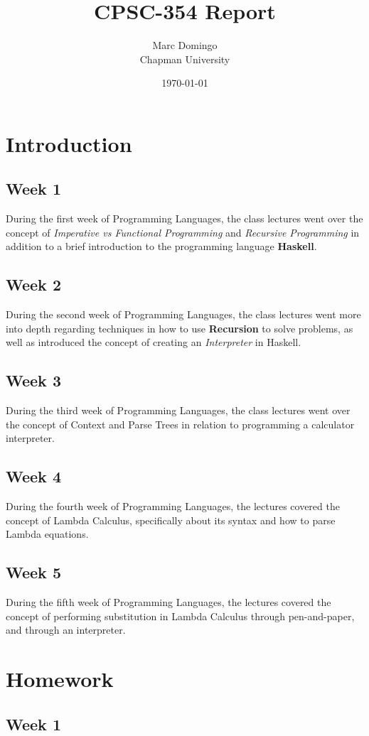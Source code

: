 \documentclass{article}
\title{CPSC-354 Report}
\author{Marc Domingo  \\ Chapman University}
\date{\today}
\theoremstyle{theorem}
\theoremstyle{definition}
\theoremstyle{remark}
\begin{document}
\maketitle
\section{Introduction}\label{introduction}
\subsection{Week 1}
\hspace{10mm} During the first week of Programming Languages, the class lectures went over the concept of \textit{Imperative vs Functional Programming} and \textit{Recursive Programming} in addition to a brief introduction to the programming language \textbf{Haskell}.
\subsection{Week 2}
\hspace{10mm} During the second week of Programming Languages, the class lectures went more into depth regarding techniques in how to use \textbf{Recursion} to solve problems, as well as introduced the concept of creating an \textit{Interpreter} in Haskell.
\subsection{Week 3} During the third week of Programming Languages, the class lectures went over the concept of Context and Parse Trees in relation to programming a calculator interpreter.
\subsection{Week 4} During the fourth week of Programming Languages, the lectures covered the concept of Lambda Calculus, specifically about its syntax and how to parse Lambda equations.
\subsection{Week 5} During the fifth week of Programming Languages, the lectures covered the concept of performing substitution in Lambda Calculus through pen-and-paper, and through an interpreter.
\section{Homework}\label{homework}
\subsection{Week 1}
\end{document}

